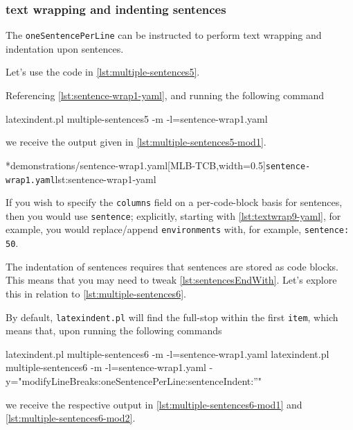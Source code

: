 \subsubsection{text wrapping and indenting sentences}
	The \texttt{oneSentencePerLine}%
	 can be instructed to perform
	text wrapping and indentation upon sentences.

	Let's use the code in \cref{lst:multiple-sentences5}.


	Referencing \cref{lst:sentence-wrap1-yaml}, and running the following command
	\begin{commandshell}
latexindent.pl multiple-sentences5 -m -l=sentence-wrap1.yaml
\end{commandshell}
	we receive the output given in \cref{lst:multiple-sentences5-mod1}.

	\begin{cmhtcbraster}[ raster left skip=-3.5cm,
			raster right skip=-2cm,
			raster force size=false,
			raster column 1/.style={add to width=.1\textwidth},
			raster column skip=.06\linewidth]
		\cmhlistingsfromfile[style=yaml-LST]*{demonstrations/sentence-wrap1.yaml}[MLB-TCB,width=0.5\textwidth]{\texttt{sentence-wrap1.yaml}}{lst:sentence-wrap1-yaml}
	\end{cmhtcbraster}

	If you wish to specify the \texttt{columns} field on a per-code-block basis
	for sentences, then you would use \texttt{sentence}; explicitly, starting with
	\vref{lst:textwrap9-yaml}, for example, you  would replace/append
	\texttt{environments} with, for example, \texttt{sentence: 50}.

	The indentation of sentences requires that sentences are stored as code blocks. This
	means that you may need to tweak \vref{lst:sentencesEndWith}. Let's explore this in
	relation to \cref{lst:multiple-sentences6}.


	By default, \texttt{latexindent.pl} will find the full-stop within the first
	\texttt{item}, which means that, upon running the following commands
	\begin{commandshell}
latexindent.pl multiple-sentences6 -m -l=sentence-wrap1.yaml 
latexindent.pl multiple-sentences6 -m -l=sentence-wrap1.yaml -y="modifyLineBreaks:oneSentencePerLine:sentenceIndent:''"
\end{commandshell}
	we receive the respective output in \cref{lst:multiple-sentences6-mod1} and
	\cref{lst:multiple-sentences6-mod2}.


